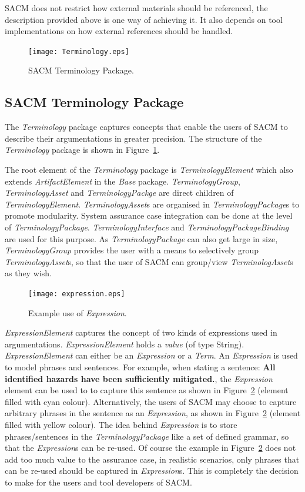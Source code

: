 SACM does not restrict how external materials should be referenced, the description provided above is one way of achieving it. 
It also depends on tool implementations on how external references should be handled. 
\begin{figure}[ht!]
	\centering
	\texttt{[image: Terminology.eps]}
	\caption{SACM Terminology Package.}
	\label{fig:term}
\end{figure}
\subsection{SACM Terminology Package}
\label{sec:termPack}
The \textit{Terminology} package captures concepts that enable the users of SACM to describe their argumentations in greater precision. 
The structure of the \textit{Terminology} package is shown in Figure~\ref{fig:term}.

The root element of the \textit{Terminology} package is \textit{TerminologyElement} which also extends \textit{ArtifactElement} in the \textit{Base} package. 
\textit{TerminologyGroup}, \textit{TerminologyAsset} and \textit{TerminologyPackge} are direct children of \textit{TerminologyElement}. 
\textit{TerminologyAsset}s are organised in \textit{TerminologyPackage}s to promote modularity. System assurance case integration can be done at the level of \textit{TerminologyPackage}. 
\textit{TerminologyInterface} and \textit{TerminologyPackageBinding} are used for this purpose. 
As \textit{TerminologyPackage} can also get large in size, \textit{TerminologyGroup} provides the user with a means to selectively group \textit{TerminologyAsset}s, so that the user of SACM can group/view \textit{TerminologAsset}s as they wish.

\begin{figure}
	\centering
	\texttt{[image: expression.eps]}
	\caption{Example use of \textit{Expression}.}
	\label{fig:expression}
\end{figure}

\textit{ExpressionElement} captures the concept of two kinds of expressions used in argumentations. \textit{ExpressionElement} holds a \textit{value} (of type String). 
\textit{ExpressionElement} can either be an \textit{Expression} or a \textit{Term}. 
An \textit{Expression} is used to model phrases and sentences. 
For example, when stating a sentence: \textbf{All identified hazards have been sufficiently mitigated.}, the \textit{Expression} element can be used to to capture this sentence as shown in Figure~\ref{fig:expression} (element filled with cyan colour). 
Alternatively, the users of SACM may choose to capture arbitrary phrases in the sentence as an \textit{Expression}, as shown in Figure~\ref{fig:expression} (element filled with yellow colour). 
The idea behind \textit{Expression} is to store phrases/sentences in the \textit{TerminologyPackage} like a set of defined grammar, so that the \textit{Expression}s can be re-used. 
Of course the example in Figure~\ref{fig:expression} does not add too much value to the assurance case, in realistic scenarios, only phrases that can be re-used should be captured in \textit{Expression}s. 
This is completely the decision to make for the users and tool developers of SACM. 

